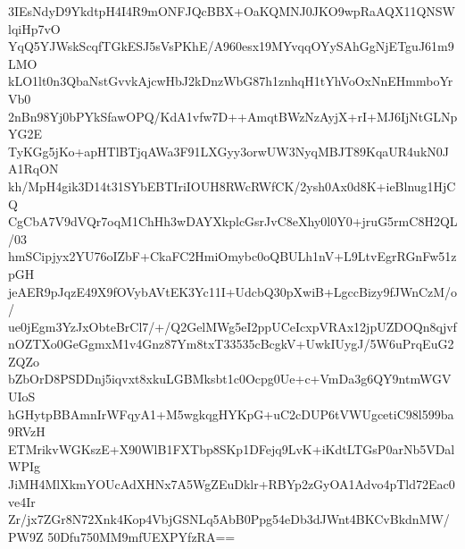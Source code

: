 3IEsNdyD9YkdtpH4I4R9mONFJQcBBX+OaKQMNJ0JKO9wpRaAQX11QNSWlqiHp7vO
YqQ5YJWskScqfTGkESJ5sVsPKhE/A960esx19MYvqqOYySAhGgNjETguJ61m9LMO
kLO1lt0n3QbaNstGvvkAjcwHbJ2kDnzWbG87h1znhqH1tYhVoOxNnEHmmboYrVb0
2nBn98Yj0bPYkSfawOPQ/KdA1vfw7D++AmqtBWzNzAyjX+rI+MJ6IjNtGLNpYG2E
TyKGg5jKo+apHTlBTjqAWa3F91LXGyy3orwUW3NyqMBJT89KqaUR4ukN0JA1RqON
kh/MpH4gik3D14t31SYbEBTIriIOUH8RWcRWfCK/2ysh0Ax0d8K+ieBlnug1HjCQ
CgCbA7V9dVQr7oqM1ChHh3wDAYXkplcGsrJvC8eXhy0l0Y0+jruG5rmC8H2QL/03
hmSCipjyx2YU76oIZbF+CkaFC2HmiOmybc0oQBULh1nV+L9LtvEgrRGnFw51zpGH
jeAER9pJqzE49X9fOVybAVtEK3Yc11I+UdcbQ30pXwiB+LgccBizy9fJWnCzM/o/
ue0jEgm3YzJxObteBrCl7/+/Q2GelMWg5eI2ppUCeIcxpVRAx12jpUZDOQn8qjvf
nOZTXo0GeGgmxM1v4Gnz87Ym8txT33535cBcgkV+UwkIUygJ/5W6uPrqEuG2ZQZo
bZbOrD8PSDDnj5iqvxt8xkuLGBMksbt1c0Ocpg0Ue+c+VmDa3g6QY9ntmWGVUIoS
hGHytpBBAmnIrWFqyA1+M5wgkqgHYKpG+uC2cDUP6tVWUgcetiC98l599ba9RVzH
ETMrikvWGKszE+X90WlB1FXTbp8SKp1DFejq9LvK+iKdtLTGsP0arNb5VDalWPIg
JiMH4MlXkmYOUcAdXHNx7A5WgZEuDklr+RBYp2zGyOA1Advo4pTld72Eac0ve4Ir
Zr/jx7ZGr8N72Xnk4Kop4VbjGSNLq5AbB0Ppg54eDb3dJWnt4BKCvBkdnMW/PW9Z
50Dfu750MM9mfUEXPYfzRA==
